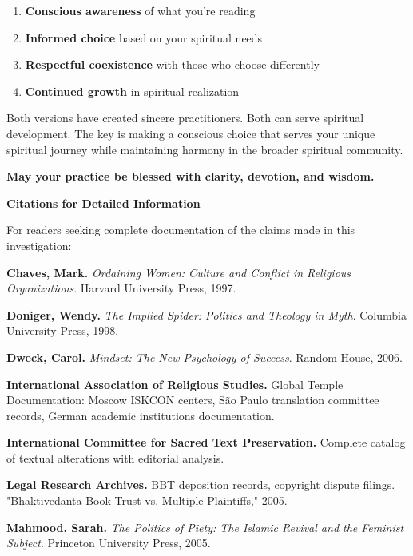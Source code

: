 \documentclass[11pt,twoside]{book}
\begin{document}
\begin{enumerate}
\item \textbf{\textbf{Conscious awareness}} of what you're reading
\item \textbf{\textbf{Informed choice}} based on your spiritual needs
\item \textbf{\textbf{Respectful coexistence}} with those who choose differently
\item \textbf{\textbf{Continued growth}} in spiritual realization
\end{enumerate}

Both versions have created sincere practitioners. Both can serve spiritual development. The key is making a conscious choice that serves your unique spiritual journey while maintaining harmony in the broader spiritual community.

\textbf{May your practice be blessed with clarity, devotion, and wisdom.}

\clearpage
\pagestyle{sectionopening}
\thispagestyle{sectionopening}
\markboth{}{}
\markright{}
\vspace*{0.25\textheight}
\begin{center}
{\Huge\bfseries Citations for Detailed Information}
\end{center}
\newpage

For readers seeking complete documentation of the claims made in this investigation:


\textbf{\textbf{Chaves, Mark.}} \emph{Ordaining Women: Culture and Conflict in Religious Organizations}. Harvard University Press, 1997.

\textbf{\textbf{Doniger, Wendy.}} \emph{The Implied Spider: Politics and Theology in Myth}. Columbia University Press, 1998.

\textbf{\textbf{Dweck, Carol.}} \emph{Mindset: The New Psychology of Success}. Random House, 2006.

\textbf{\textbf{International Association of Religious Studies.}} Global Temple Documentation: Moscow ISKCON centers, São Paulo translation committee records, German academic institutions documentation.

\textbf{\textbf{International Committee for Sacred Text Preservation.}} Complete catalog of textual alterations with editorial analysis.

\textbf{\textbf{Legal Research Archives.}} BBT deposition records, copyright dispute filings. "Bhaktivedanta Book Trust vs. Multiple Plaintiffs," 2005.

\textbf{\textbf{Mahmood, Sarah.}} \emph{The Politics of Piety: The Islamic Revival and the Feminist Subject}. Princeton University Press, 2005.
\end{document}

